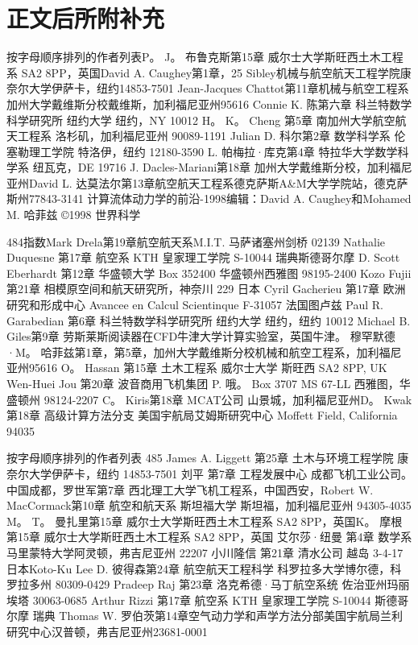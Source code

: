\documentclass[UTF8,11pt,a4paper,openany,fontset=fandol]{ctexbook}
\begin{document}
\chapter*{正文后所附补充}
按字母顺序排列的作者列表P。 J。 布鲁克斯第15章 威尔士大学斯旺西土木工程系 SA2 8PP，英国David A. Caughey第1章，25 Sibley机械与航空航天工程学院康奈尔大学伊萨卡，纽约14853-7501 Jean-Jacques Chattot第11章机械与航空工程系加州大学戴维斯分校戴维斯，加利福尼亚州95616 Connie K. 陈第六章 科兰特数学科学研究所 纽约大学 纽约，NY 10012 H。 K。 Cheng 第5章 南加州大学航空航天工程系 洛杉矶，加利福尼亚州 90089-1191 Julian D. 科尔第2章 数学科学系 伦塞勒理工学院 特洛伊，纽约 12180-3590 L. 帕梅拉·库克第4章 特拉华大学数学科学系 纽瓦克，DE 19716 J. Dacles-Mariani第18章 加州大学戴维斯分校，加利福尼亚州David L. 达莫法尔第13章航空航天工程系德克萨斯A\&M大学学院站，德克萨斯州77843-3141 计算流体动力学的前沿-1998编辑：David A. Caughey和Mohamed M. 哈菲兹 ©1998 世界科学

484指数Mark Drela第19章航空航天系M.I.T. 马萨诸塞州剑桥 02139 Nathalie Duquesne 第17章 航空系 KTH 皇家理工学院 S-10044 瑞典斯德哥尔摩 D. Scott Eberhardt 第12章 华盛顿大学 Box 352400 华盛顿州西雅图 98195-2400 Kozo Fujii 第21章 相模原空间和航天研究所，神奈川 229 日本 Cyril Gacherieu 第17章 欧洲研究和形成中心 Avancee en Calcul Scientinque F-31057 法国图卢兹 Paul R. Garabedian 第6章 科兰特数学科学研究所 纽约大学 纽约，纽约 10012 Michael B. Giles第9章 劳斯莱斯阅读器在CFD牛津大学计算实验室，英国牛津。 穆罕默德·M。 哈菲兹第1章，第5章，加州大学戴维斯分校机械和航空工程系，加利福尼亚州95616 O。 Hassan 第15章 土木工程系 威尔士大学 斯旺西 SA2 8PP, UK Wen-Huei Jou 第20章 波音商用飞机集团 P. 哦。 Box 3707 MS 67-LL 西雅图，华盛顿州 98124-2207 C。 Kiris第18章 MCAT公司 山景城，加利福尼亚州D。 Kwak 第18章 高级计算方法分支 美国宇航局艾姆斯研究中心 Moffett Field, California 94035

按字母顺序排列的作者列表 485 James A. Liggett 第25章 土木与环境工程学院 康奈尔大学伊萨卡，纽约 14853-7501 刘平 第7章 工程发展中心 成都飞机工业公司。 中国成都，罗世军第7章 西北理工大学飞机工程系，中国西安，Robert W. MacCormack第10章 航空和航天系 斯坦福大学 斯坦福，加利福尼亚州 94305-4035 M。 T。 曼扎里第15章 威尔士大学斯旺西土木工程系 SA2 8PP，英国K。 摩根第15章 威尔士大学斯旺西土木工程系 SA2 8PP，英国 艾尔莎·纽曼 第4章 数学系 马里蒙特大学阿灵顿，弗吉尼亚州 22207 小川隆信 第21章 清水公司 越岛 3-4-17 日本Koto-Ku Lee D. 彼得森第24章 航空航天工程科学 科罗拉多大学博尔德，科罗拉多州 80309-0429 Pradeep Raj 第23章 洛克希德·马丁航空系统 佐治亚州玛丽埃塔 30063-0685 Arthur Rizzi 第17章 航空系 KTH 皇家理工学院 S-10044 斯德哥尔摩 瑞典 Thomas W. 罗伯茨第14章空气动力学和声学方法分部美国宇航局兰利研究中心汉普顿，弗吉尼亚州23681-0001
\end{document}
